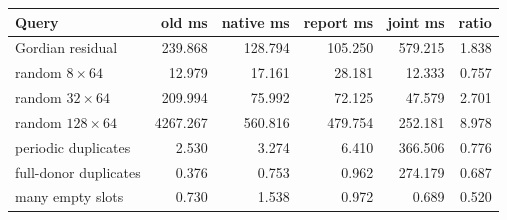 \begin{center}\small
\begin{tabular}{@{}lrrrrr@{}}
\toprule
Query & old ms & native ms & report ms & joint ms & ratio \\
\midrule
Gordian residual & 239.868 & 128.794 & 105.250 & 579.215 & 1.838 \\
random $8\times64$ & 12.979 & 17.161 & 28.181 & 12.333 & 0.757 \\
random $32\times64$ & 209.994 & 75.992 & 72.125 & 47.579 & 2.701 \\
random $128\times64$ & 4267.267 & 560.816 & 479.754 & 252.181 & 8.978 \\
periodic duplicates & 2.530 & 3.274 & 6.410 & 366.506 & 0.776 \\
full-donor duplicates & 0.376 & 0.753 & 0.962 & 274.179 & 0.687 \\
many empty slots & 0.730 & 1.538 & 0.972 & 0.689 & 0.520 \\
\bottomrule
\end{tabular}
\end{center}
